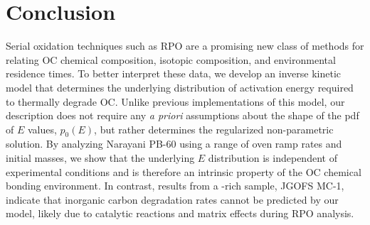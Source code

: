 
\section{Conclusion}

Serial oxidation techniques such as RPO are a promising new class of methods for relating OC chemical composition, isotopic composition, and environmental residence times. To better interpret these data, we develop an inverse kinetic model that determines the underlying distribution of activation energy required to thermally degrade OC. Unlike previous implementations of this model, our description does not require any \textit{a priori} assumptions about the shape of the pdf of $E$ values, $p_{0}(E)$, but rather determines the regularized non-parametric solution. By analyzing Narayani PB-60 using a range of oven ramp rates and initial masses, we show that the underlying $E$ distribution is independent of experimental conditions and is therefore an intrinsic property of the OC chemical bonding environment. In contrast, results from a -rich sample, JGOFS MC-1, indicate that inorganic carbon degradation rates cannot be predicted by our model, likely due to catalytic reactions and matrix effects during RPO analysis.

